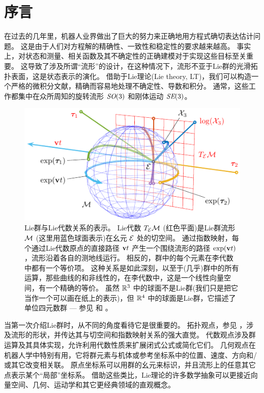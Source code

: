 
\section{序言}
\label{sec:intro}

在过去的几年里，机器人业界做出了巨大的努力来正确地用方程式确切表达估计问题。 
这是由于人们对方程解的精确性、一致性和稳定性的要求越来越高。 
事实上，对状态和测量、相关函数及其不确定性的正确建模对于实现这些目标至关重要。
这导致了涉及所谓“流形”的设计，在这种情况下，流形不亚于Lie群的光滑拓扑表面，这是状态表示的演化。
借助于Lie理论(Lie theory, LT)，我们可以构造一个严格的微积分文献，精确而容易地处理不确定性、导数和积分。
通常，这些工作都集中在众所周知的旋转流形 $\textit{SO}(3)$ 和刚体运动 $\textit{SE}(3)$。

\begin{figure}[tb]
\centering
\includegraphics{figures/exponential}
\caption{Lie群与Lie代数关系的表示。
Lie代数 $T_{\mathcal{E}}{\mathcal{M}}$ (红色平面)是Lie群流形 $\mathcal{M}$ (这里用蓝色球面表示)在幺元 $\mathcal{E}$ 处的切空间。
通过指数映射，每个通过Lie代数原点的直接路径 ${\bf v} t$ 产生一个围绕流形的路径 $\exp({\bf v} t)$ ，流形沿着各自的测地线运行。 
相反的，群中的每个元素在李代数中都有一个等价项。
这种关系是如此深刻，以至于(几乎)群中的所有运算，那些曲线的和非线性的，在李代数中，这是一个线性向量空间，有一个精确的等价。
虽然 ${\mathbb R}^3$ 中的球面不是Lie群(我们只是把它当作一个可以画在纸上的表示)，但 ${\mathbb R}^4$ 中的球面是Lie群，它描述了单位四元数群 --- 参见  和  。
}
\label{fig:exponential}
\end{figure}

当第一次介绍Lie群时，从不同的角度看待它是很重要的。 
拓扑观点，参见  ，涉及流形的形状，并传达其与切空间和指数映射关系的强大直觉。
代数观点涉及群运算及其具体实现，允许利用代数性质来扩展闭式公式或简化它们。
几何观点在机器人学中特别有用，它将群元素与机体或参考坐标系中的位置、速度、方向和/或其它改变相关联。
原点坐标系可以用群的幺元来标识，并且流形上的任意其它点表示某个“局部”坐标系。
借助这些类比，Lie理论的许多数学抽象可以更接近向量空间、几何、运动学和其它更经典领域的直观概念。


